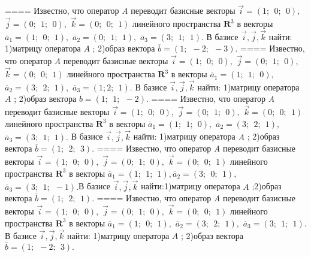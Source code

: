 ====
Известно, что оператор \emph{A} переводит базисные векторы \(\overrightarrow{i} = (1;\ \ 0;\ \ 0),\) \(\overrightarrow{j} = (0;\ \ 1;\ \ 0),\) \(\overrightarrow{k} = (0;\ \ 0;\ \ 1)\) линейного пространства \(\mathbf{R}^{3}\) в векторы \({\overline{a}}_{1} = (1;\ \ 0;\ \ 1),\) \({\overline{a}}_{2} = (0;\ \ 1;\ \ 1),\) \({\overline{a}}_{3} = (3;\ \ 1;\ \ 1).\) В базисе \(\overrightarrow{i},\overrightarrow{j},\overrightarrow{k}\) найти: 1)матрицу оператора \(A\) ; 2)образ вектора \(\overline{b} = (1;\ \  - 2;\ \  - 3).\)
====
Известно, что оператор \emph{A} переводит базисные векторы \(\overrightarrow{i} = (1;\ \ 0;\ \ 0),\) \(\overrightarrow{j} = (0;\ \ 1;\ \ 0),\) \(\overrightarrow{k} = (0;\ \ 0;\ \ 1)\) линейного пространства \(\mathbf{R}^{3}\) в векторы \({\overline{a}}_{1} = (1;\ \ 1;\ \ 0),\) \({\overline{a}}_{2} = (3;\ \ 2;\ \ 1),\) \({\overline{a}}_{3} = (1;2;\ \ 1).\) В базисе \(\overrightarrow{i},\overrightarrow{j},\overrightarrow{k}\) найти: 1)матрицу оператора \(A\) ; 2)образ вектора \(\overline{b} = (1;\ \ 1;\ \  - 2).\)
====
Известно, что оператор \emph{A} переводит базисные векторы \(\overrightarrow{i} = (1;\ \ 0;\ \ 0),\) \(\overrightarrow{j} = (0;\ \ 1;\ \ 0),\) \(\overrightarrow{k} = (0;\ \ 0;\ \ 1)\) линейного пространства \(\mathbf{R}^{3}\) в векторы \({\overline{a}}_{1} = (1;\ \ 1;\ \ 0),\) \({\overline{a}}_{2} = (3;\ \ 2;\ \ 1),\) \({\overline{a}}_{3} = (3;\ \ 1;\ \ 1).\) В базисе \(\overrightarrow{i},\overrightarrow{j},\overrightarrow{k}\) найти: 1)матрицу оператора \(A\) ; 2)образ вектора \(\overline{b} = (1;\ \ 2;\ \ 3).\)
====
Известно, что оператор \emph{A} переводит базисные векторы \(\overrightarrow{i} = (1;\ \ 0;\ \ 0),\) \(\overrightarrow{j} = (0;\ \ 1;\ \ 0),\) \(\overrightarrow{k} = (0;\ \ 0;\ \ 1)\) линейного пространства \(\mathbf{R}^{3}\) в векторы \({\overline{a}}_{1} = (1;\ \ 1;\ \ 1),{\overline{a}}_{2} = (3;\ \ 0;\ \ 1),\) \({\overline{a}}_{3} = (3;\ \ 1;\ \  - 1).\)В базисе \(\overrightarrow{i},\overrightarrow{j},\overrightarrow{k}\) найти:1)матрицу оператора \(A\) ;2)образ вектора \(\overline{b} = (1;\ \ 2;\ \ 1).\)
====
Известно, что оператор \emph{A} переводит базисные векторы \(\overrightarrow{i} = (1;\ \ 0;\ \ 0),\) \(\overrightarrow{j} = (0;\ \ 1;\ \ 0),\) \(\overrightarrow{k} = (0;\ \ 0;\ \ 1)\) линейного пространства \(\mathbf{R}^{3}\) в векторы \({\overline{a}}_{1} = (1;\ \ 0;\ \ 1),\) \({\overline{a}}_{2} = (3;\ \ 2;\ \ 1),\) \({\overline{a}}_{3} = (3;\ \ 1;\ \ 1).\) В базисе \(\overrightarrow{i},\overrightarrow{j},\overrightarrow{k}\) найти: 1)матрицу оператора \(A\) ; 2)образ вектора \(\overline{b} = (1;\ \  - 2;\ \ 3).\)
